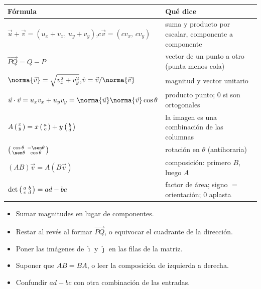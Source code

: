 \documentclass[11pt,a4paper]{article}
\newcommand{\ii}{\hat{\imath}}
\newcommand{\jj}{\hat{\jmath}}
\newcommand{\vecdos}[2]{\mathchoice{\begin{pmatrix}#1\\ #2\end{pmatrix}}{\left(\begin{smallmatrix}#1\\ #2\end{smallmatrix}\right)}{\left(\begin{smallmatrix}#1\\ #2\end{smallmatrix}\right)}{\left(\begin{smallmatrix}#1\\ #2\end{smallmatrix}\right)}}
\newcommand{\matdos}[4]{\mathchoice{\begin{pmatrix}#1 & #2\\ #3 & #4\end{pmatrix}}{\left(\begin{smallmatrix}#1 & #2\\ #3 & #4\end{smallmatrix}\right)}{\left(\begin{smallmatrix}#1 & #2\\ #3 & #4\end{smallmatrix}\right)}{\left(\begin{smallmatrix}#1 & #2\\ #3 & #4\end{smallmatrix}\right)}}
\begin{document}
\clearpage
\repaso
\begin{center}\renewcommand{\arraystretch}{1.55}
\begin{tabularx}{\linewidth}{@{}>{\raggedright\arraybackslash}p{74mm} L@{}}
\toprule
Fórmula & Qué dice\\ \midrule
$\vec u+\vec v=(u_x+v_x,\,u_y+v_y)$,\quad $c\vec v=(cv_x,\,cv_y)$ & suma y producto por escalar, componente a componente\\
$\overrightarrow{PQ}=Q-P$ & vector de un punto a otro (punta menos cola)\\
$\norma{\vec v}=\sqrt{v_x^2+v_y^2}$,\quad $\hat v=\vec v/\norma{\vec v}$ & magnitud y vector unitario\\
$\vec u\cdot\vec v=u_xv_x+u_yv_y=\norma{\vec u}\norma{\vec v}\cos\theta$ & producto punto; $0$ si son ortogonales\\
$A\vecdos xy=x\vecdos ac+y\vecdos bd$ & la imagen es una combinación de las columnas\\
$\matdos{\cos\theta}{-\sen\theta}{\sen\theta}{\cos\theta}$ & rotación en $\theta$ (antihoraria)\\
$(AB)\vec v=A(B\vec v)$ & composición: primero $B$, luego $A$\\
$\det\matdos abcd=ad-bc$ & factor de área; signo $=$ orientación; $0$ aplasta\\
\bottomrule
\end{tabularx}
\end{center}

\begin{ojo}
\begin{itemize}
\item Sumar magnitudes en lugar de componentes.
\item Restar al revés al formar $\overrightarrow{PQ}$, o equivocar el cuadrante de la dirección.
\item Poner las imágenes de $\ii$ y $\jj$ en las filas de la matriz.
\item Suponer que $AB=BA$, o leer la composición de izquierda a derecha.
\item Confundir $ad-bc$ con otra combinación de las entradas.
\end{itemize}
\end{ojo}
\end{document}
